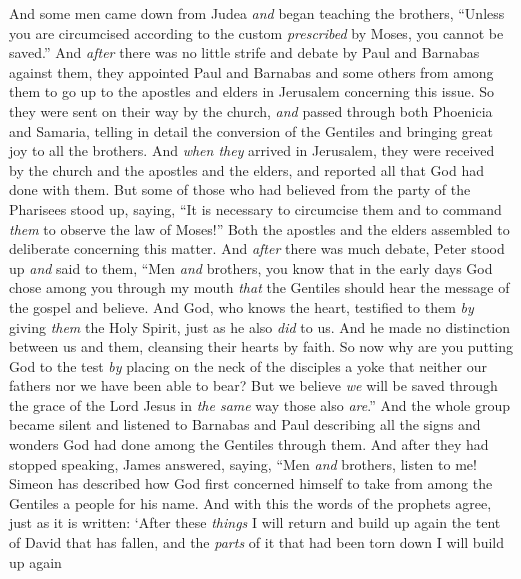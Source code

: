 \begin{biblechapter} %
 And some men came down from Judea \textit{and} began teaching the brothers, “Unless you are circumcised according to the custom \textit{prescribed} by Moses, you cannot be saved.”
\verse And \textit{after} there was no little strife and debate by Paul and Barnabas against them, they appointed Paul and Barnabas and some others from among them to go up to the apostles and elders in Jerusalem concerning this issue.
\verse So they were sent on their way by the church, \textit{and} passed through both Phoenicia and Samaria, telling in detail the conversion of the Gentiles and bringing great joy to all the brothers.
\verse And \textit{when they} arrived in Jerusalem, they were received by the church and the apostles and the elders, and reported all that God had done with them.
\verse But some of those who had believed from the party of the Pharisees stood up, saying, “It is necessary to circumcise them and to command \textit{them} to observe the law of Moses!”
\verse Both the apostles and the elders assembled to deliberate concerning this matter.
\verse And \textit{after} there was much debate, Peter stood up \textit{and} said to them, “Men \textit{and} brothers, you know that in the early days God chose among you through my mouth \textit{that} the Gentiles should hear the message of the gospel and believe.
\verse And God, who knows the heart, testified to them \textit{by} giving \textit{them} the Holy Spirit, just as he also \textit{did} to us.
\verse And he made no distinction between us and them, cleansing their hearts by faith.
\verse So now why are you putting God to the test \textit{by} placing on the neck of the disciples a yoke that neither our fathers nor we have been able to bear?
\verse But we believe \textit{we} will be saved through the grace of the Lord Jesus in \textit{the same} way those also \textit{are}.”
\verse And the whole group became silent and listened to Barnabas and Paul describing all the signs and wonders God had done among the Gentiles through them.
\verse And after they had stopped speaking, James answered, saying, “Men \textit{and} brothers, listen to me!
\verse Simeon has described how God first concerned himself to take from among the Gentiles a people for his name.
\verse And with this the words of the prophets agree, just as it is written:
\verse ‘After these \textit{things} I will return 
and build up again the tent of David that has fallen, 
and the \textit{parts} of it that had been torn down I will build up again 

\end{biblechapter}
